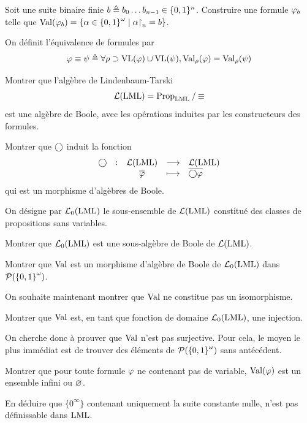 \begin{problem}
  \begin{pbQuest}
  \item Soit une suite binaire finie $b \triangleq b_0\ldots b_{n-1} \in \{0,1\}^n$.
    Construire une formule $\varphi_b$ telle que
    $\operatorname{Val}(\varphi_b) = \left\{ \alpha\in{\{0,1\}}^{\omega} \;\middle\vert\; \alpha\mathbin{\upharpoonright}_{n} = b \right\}$.
  \end{pbQuest}

  \noindent
  On définit l'équivalence de formules par
  \[\varphi\equiv\psi \triangleq \forall \rho\supset \operatorname{VL}(\varphi)\cup\operatorname{VL}(\psi),
  \operatorname{Val}_{\rho}(\varphi) = \operatorname{Val}_{\rho}(\psi)\]
  \begin{pbQuest}[resume]
  \item Montrer que l'algèbre de Lindenbaum-Tarski
    \[\mathcal{L}(\operatorname{LML}) = \mathord{\operatorname{Prop}_{\operatorname{LML}}}\mathbin{/}\mathord{\equiv}\]
    est une algèbre de Boole, avec les opérations induites par les
    constructeurs des formules.
  \item Montrer que $\mathbin{\bigcirc}$ induit la fonction
    \[
    \makeFun{\modNext}{\LinTar(\LML)}{\LinTar(\LML)}
            {\clas{\varFF}}{\clas{\modNext\varFF}}
    \]
    qui est un morphisme d'algèbres de Boole.
  \end{pbQuest}

  \noindent
  On désigne par $\mathcal{L}_0(\operatorname{LML})$ le sous-ensemble de $\mathcal{L}(\operatorname{LML})$
  constitué des classes de propositions sans variables.
  \begin{pbQuest}[resume]
  \item Montrer que $\mathcal{L}_0(\operatorname{LML})$ est une sous-algèbre de Boole de
    $\mathcal{L}(\operatorname{LML})$.
  \item Montrer que $\operatorname{Val}$ est un morphisme d'algèbre de Boole de
    $\mathcal{L}_0(\operatorname{LML})$ dans $\mathcal{P}({\{0,1\}}^{\omega})$.
  \end{pbQuest}

  \noindent
  On souhaite maintenant montrer que $\operatorname{Val}$ ne constitue pas un isomorphisme.
  \begin{pbQuest}[resume]
  \item Montrer que $\operatorname{Val}$ est, en tant que fonction de domaine
    $\mathcal{L}_0(\operatorname{LML})$, une injection.
  \end{pbQuest}

  \noindent
  On cherche donc à prouver que $\operatorname{Val}$ n'est pas surjective. Pour cela, le
  moyen le plus immédiat est de trouver des éléments de $\mathcal{P}({\{0,1\}}^{\omega})$
  sans antécédent.
  \begin{pbQuest}[resume]
  \item Montrer que pour toute formule $\varphi$ ne contenant pas de variable,
    $\operatorname{Val}(\varphi)$ est un ensemble infini ou $\varnothing$.
  \item En déduire que $\{0^\infty\}$ contenant uniquement la suite constante
    nulle, n'est pas définissable dans $\operatorname{LML}$.
  \end{pbQuest}


\end{problem}
